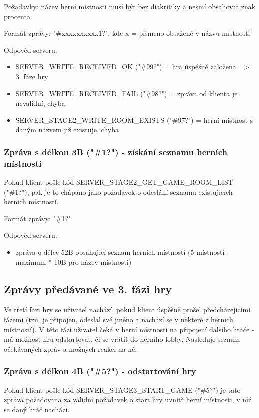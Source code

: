 \documentclass[12pt, a4paper, pdftex, czech, titlepage]{report}
\begin{document}
Požadavky: název herní místnosti musí být bez diakritiky a nesmí obsahovat
znak procenta.

Formát zprávy: "\#xxxxxxxxxx1?", kde x = písmeno obsažené v názvu místnosti

Odpověď serveru:
\begin{itemize}
\item SERVER\_WRITE\_RECEIVED\_OK ("\#99?") = hra úspěšně založena => 3. fáze hry
\item SERVER\_WRITE\_RECEIVED\_FAIL ("\#98?") = zpráva od klienta je nevalidní, chyba
\item SERVER\_STAGE2\_WRITE\_ROOM\_EXISTS ("\#97?") = herní místnost s daným názvem již existuje, chyba
\end{itemize}

\subsubsection{Zpráva s délkou 3B ("\#1?") - získání seznamu herních místností}
Pokud klient pošle kód SERVER\_STAGE2\_GET\_GAME\_ROOM\_LIST ("\#1?"),
pak je to chápáno jako požadavek o odeslání seznamu existujících herních místností.

Formát zprávy: "\#1?"

Odpověď serveru:
\begin{itemize}
\item zpráva o délce 52B obsahující seznam herních místností (5 místností maximum * 10B pro název místnosti)
\end{itemize}

\subsection{Zprávy předávané ve 3. fázi hry}
Ve třetí fázi hry se uživatel nachází, pokud klient úspěšně prošel
předcházejícími fázemi (tzn. je připojen, odeslal své jméno a nachází se v některé z herních místností).
V této fázi uživatel čeká v herní místnosti na připojení dalšího hráče - má možnost hru odstartovat,
či se vrátit do herního lobby. Následuje seznam očekávaných zpráv a možných reakcí na ně.

\subsubsection{Zpráva s délkou 4B ("\#5?") - odstartování hry}
Pokud klient pošle kód SERVER\_STAGE3\_START\_GAME ("\#5?") je tato zpráva
požadována za validní požadavek o start hry uvnitř herní místnosti, v níž se daný hráč nachází.
\end{document}

